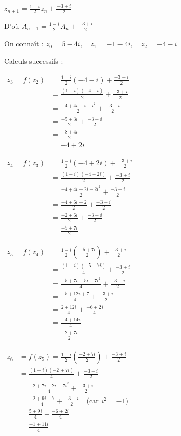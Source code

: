 \documentclass[12pt,a4paper]{article}
\begin{document}
\begin{enumerate}
\begin{enumerate}
        \( z_{n+1} = \frac{1 - i}{2}z_n + \frac{-3 + i}{2} \)

        D'où \( A_{n+1} = \frac{1 - i}{2}A_n + \frac{-3 + i}{2} \)

        On connaît : \(z_0 = 5 - 4i,\quad z_1 = -1 - 4i,\quad z_2 = -4 - i\)

        Calculs successifs : 
        
\(
\begin{aligned}
z_3 = f(z_2) &= \frac{1 - i}{2}(-4 - i) + \frac{-3 + i}{2} \\
             &= \frac{(1 - i)(-4 - i)}{2} + \frac{-3 + i}{2} \\
             &= \frac{-4 + 4i - i + i^2}{2} + \frac{-3 + i}{2} \\
             &= \frac{-5 + 3i}{2} + \frac{-3 + i}{2} \\
             &= \frac{-8 + 4i}{2} \\
             &= -4 + 2i
\end{aligned}
\)

\(
\begin{aligned}
z_4 = f(z_3) &= \frac{1 - i}{2}(-4 + 2i) + \frac{-3 + i}{2} \\
             &= \frac{(1 - i)(-4 + 2i)}{2} + \frac{-3 + i}{2} \\
             &= \frac{-4 + 4i + 2i - 2i^2}{2} + \frac{-3 + i}{2} \\
             &= \frac{-4 + 6i + 2}{2} + \frac{-3 + i}{2} \\
             &= \frac{-2 + 6i}{2} + \frac{-3 + i}{2} \\
             &= \frac{-5 + 7i}{2}
\end{aligned}
\)

\(
\begin{aligned}
z_5 = f(z_4) &= \frac{1 - i}{2} \left( \frac{-5 + 7i}{2} \right) + \frac{-3 + i}{2} \\
             &= \frac{(1 - i)(-5 + 7i)}{4} + \frac{-3 + i}{2} \\
             &= \frac{-5 + 7i + 5i - 7i^2}{4} + \frac{-3 + i}{2} \\
             &= \frac{-5 + 12i + 7}{4} + \frac{-3 + i}{2} \\
             &= \frac{2 + 12i}{4} + \frac{-6 + 2i}{4} \\
             &= \frac{-4 + 14i}{4} \\
             &= \frac{-2 + 7i}{2}
\end{aligned}
\)

\(
\begin{aligned}
z_6 &= f(z_5) = \frac{1 - i}{2} \left( \frac{-2 + 7i}{2} \right) + \frac{-3 + i}{2} \\
    &= \frac{(1 - i)(-2 + 7i)}{4} + \frac{-3 + i}{2} \\
    &= \frac{-2 + 7i + 2i - 7i^2}{4} + \frac{-3 + i}{2} \\
    &= \frac{-2 + 9i + 7}{4} + \frac{-3 + i}{2} \quad \text{(car } i^2 = -1) \\
    &= \frac{5 + 9i}{4} + \frac{-6 + 2i}{4} \\
    &= \frac{-1 + 11i}{4}
\end{aligned}
\)


\end{enumerate}
\end{enumerate}
\end{document}
